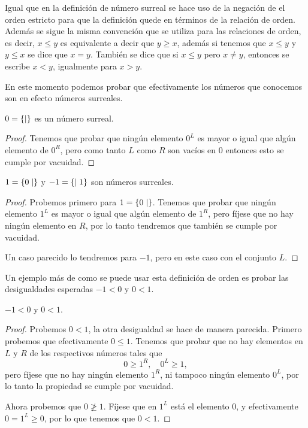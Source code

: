     Igual que en la definici\'on de n\'umero surreal se hace uso de la negaci\'on de el orden estricto para que la definici\'on quede en t\'erminos de la relaci\'on de orden. Adem\'as se sigue la misma convención que se utiliza para las relaciones de orden, es decir, $x\le y$ es equivalente a decir que $y\ge x$, adem\'as si tenemos que $x\le y$ y $y\le x$ se dice que $x=y$. Tambi\'en se dice que si $x\le y$ pero $x \not= y$, entonces se escribe $x < y$, igualmente para $x > y$.

    En este momento podemos probar que efectivamente los n\'umeros que conocemos son en efecto n\'umeros surreales.

    \begin{theorem}
        $0=\left\{\mid \right\}$ es un n\'umero surreal.
    \end{theorem}

    \begin{proof}
        Tenemos que probar que ning\'un elemento $0^L$ es mayor o igual que algún elemento de $0^R$, pero como tanto $L$ como $R$ son vac\'ios en $0$ entonces esto se cumple por vacuidad. 
    \end{proof}

    \begin{theorem}
        $1=\left\{0\mid \right\}$ y $-1=\left\{\mid 1\right\}$ son n\'umeros surreales.
    \end{theorem}

    \begin{proof}
        Probemos primero para $1=\left\{0\mid \right\}$. Tenemos que probar que ning\'un elemento $1^L$ es mayor o igual que algún elemento de $1^R$, pero f\'ijese que no hay ning\'un elemento en $R$, por lo tanto tendremos que tambi\'en se cumple por vacuidad.

        Un caso parecido lo tendremos para $-1$, pero en este caso con el conjunto $L$.
    \end{proof}

    Un ejemplo m\'as de como se puede usar esta definici\'on de orden es probar las desigualdades esperadas $-1< 0$ y $0<1$.

    \begin{theorem}
        $-1 < 0$ y $0 < 1$.
    \end{theorem}

    \begin{proof}
        Probemos $0 < 1$, la otra desigualdad se hace de manera parecida. Primero probemos que efectivamente $0\le 1$. Tenemos que probar que no hay elementos en $L$ y $R$ de los respectivos n\'umeros tales que
        \[
            0 \ge 1^R, \quad 0^L \ge 1,
        \]
        pero f\'ijese que no hay ningún elemento $1^R$, ni tampoco ningún elemento $0^L$, por lo tanto la propiedad se cumple por vacuidad.

        Ahora probemos que $0 \not\ge 1$. F\'ijese que en $1^L$ est\'a el elemento $0$, y efectivamente $0 = 1^L \ge 0$, por lo que tenemos que $0 < 1$.
    \end{proof}


